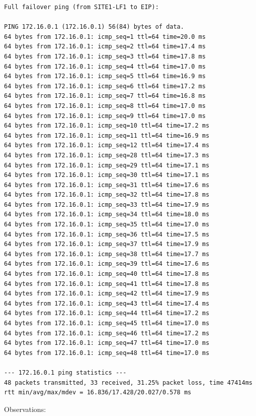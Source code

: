 \documentclass[11pt]{article}
\begin{document}
\begin{verbatim}
Full failover ping (from SITE1-LF1 to EIP):

PING 172.16.0.1 (172.16.0.1) 56(84) bytes of data.
64 bytes from 172.16.0.1: icmp_seq=1 ttl=64 time=20.0 ms
64 bytes from 172.16.0.1: icmp_seq=2 ttl=64 time=17.4 ms
64 bytes from 172.16.0.1: icmp_seq=3 ttl=64 time=17.8 ms
64 bytes from 172.16.0.1: icmp_seq=4 ttl=64 time=17.0 ms
64 bytes from 172.16.0.1: icmp_seq=5 ttl=64 time=16.9 ms
64 bytes from 172.16.0.1: icmp_seq=6 ttl=64 time=17.2 ms
64 bytes from 172.16.0.1: icmp_seq=7 ttl=64 time=16.8 ms
64 bytes from 172.16.0.1: icmp_seq=8 ttl=64 time=17.0 ms
64 bytes from 172.16.0.1: icmp_seq=9 ttl=64 time=17.0 ms
64 bytes from 172.16.0.1: icmp_seq=10 ttl=64 time=17.2 ms
64 bytes from 172.16.0.1: icmp_seq=11 ttl=64 time=16.9 ms
64 bytes from 172.16.0.1: icmp_seq=12 ttl=64 time=17.4 ms
64 bytes from 172.16.0.1: icmp_seq=28 ttl=64 time=17.3 ms
64 bytes from 172.16.0.1: icmp_seq=29 ttl=64 time=17.1 ms
64 bytes from 172.16.0.1: icmp_seq=30 ttl=64 time=17.1 ms
64 bytes from 172.16.0.1: icmp_seq=31 ttl=64 time=17.6 ms
64 bytes from 172.16.0.1: icmp_seq=32 ttl=64 time=17.8 ms
64 bytes from 172.16.0.1: icmp_seq=33 ttl=64 time=17.9 ms
64 bytes from 172.16.0.1: icmp_seq=34 ttl=64 time=18.0 ms
64 bytes from 172.16.0.1: icmp_seq=35 ttl=64 time=17.0 ms
64 bytes from 172.16.0.1: icmp_seq=36 ttl=64 time=17.5 ms
64 bytes from 172.16.0.1: icmp_seq=37 ttl=64 time=17.9 ms
64 bytes from 172.16.0.1: icmp_seq=38 ttl=64 time=17.7 ms
64 bytes from 172.16.0.1: icmp_seq=39 ttl=64 time=17.6 ms
64 bytes from 172.16.0.1: icmp_seq=40 ttl=64 time=17.8 ms
64 bytes from 172.16.0.1: icmp_seq=41 ttl=64 time=17.8 ms
64 bytes from 172.16.0.1: icmp_seq=42 ttl=64 time=17.9 ms
64 bytes from 172.16.0.1: icmp_seq=43 ttl=64 time=17.4 ms
64 bytes from 172.16.0.1: icmp_seq=44 ttl=64 time=17.2 ms
64 bytes from 172.16.0.1: icmp_seq=45 ttl=64 time=17.0 ms
64 bytes from 172.16.0.1: icmp_seq=46 ttl=64 time=17.2 ms
64 bytes from 172.16.0.1: icmp_seq=47 ttl=64 time=17.0 ms
64 bytes from 172.16.0.1: icmp_seq=48 ttl=64 time=17.0 ms

--- 172.16.0.1 ping statistics ---
48 packets transmitted, 33 received, 31.25% packet loss, time 47414ms
rtt min/avg/max/mdev = 16.836/17.428/20.027/0.578 ms
\end{verbatim}

Observations:
\end{document}
